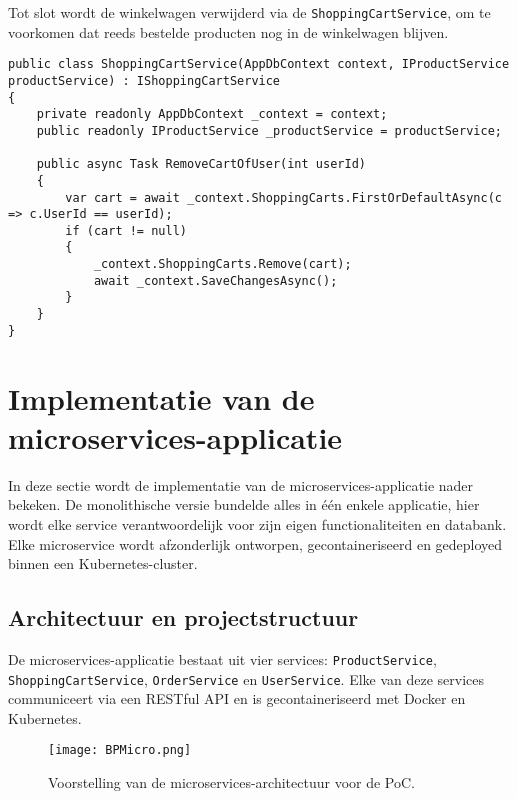 \medskip
Tot slot wordt de winkelwagen verwijderd via de \texttt{ShoppingCartService}, om te voorkomen dat reeds bestelde producten nog in de winkelwagen blijven.
\medskip

\begin{lstlisting}[style=mystyleA, caption=RemoveCartOfUser in ShoppingCartService.cs, label=lst:MonoRemoveCart]
public class ShoppingCartService(AppDbContext context, IProductService productService) : IShoppingCartService
{
	private readonly AppDbContext _context = context;
	public readonly IProductService _productService = productService;
	
	public async Task RemoveCartOfUser(int userId)
	{
		var cart = await _context.ShoppingCarts.FirstOrDefaultAsync(c => c.UserId == userId);
		if (cart != null)
		{
			_context.ShoppingCarts.Remove(cart);
			await _context.SaveChangesAsync();
		}
	}
}
\end{lstlisting}


\section{Implementatie van de microservices-applicatie}

In deze sectie wordt de implementatie van de microservices-applicatie nader bekeken. De monolithische versie bundelde alles in één enkele applicatie, hier wordt elke service verantwoordelijk voor zijn eigen functionaliteiten en databank. Elke microservice wordt afzonderlijk ontworpen, gecontaineriseerd en gedeployed binnen een Kubernetes-cluster.

\subsection{Architectuur en projectstructuur}

De microservices-applicatie bestaat uit vier services: \texttt{ProductService}, \texttt{ShoppingCartService}, \texttt{OrderService} en \texttt{UserService}. Elke van deze services communiceert via een RESTful API en is gecontaineriseerd met Docker en Kubernetes.

\begin{figure}[H]
	\centering
	\texttt{[image: BPMicro.png]}
	\caption[Voorstelling van de microservices-architectuur voor de PoC.]{\label{fig:BPMicro}Voorstelling van de microservices-architectuur voor de PoC.\linebreak}
\end{figure}

